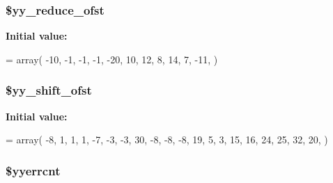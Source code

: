 \subsubsection[{\$yy\+\_\+reduce\+\_\+ofst}]{\setlength{\rightskip}{0pt plus 5cm}\$yy\+\_\+reduce\+\_\+ofst\hspace{0.3cm}{\ttfamily [static]}}\label{class_smarty___internal___configfileparser_a3b856b0c76686b62efda7789aae55234}
{\bfseries Initial value\+:}
\begin{DoxyCode}
= array(
    -10,   -1,   -1,   -1,  -20,   10,   12,    8,   14,    7,
    -11,
)
\end{DoxyCode}
\hypertarget{class_smarty___internal___configfileparser_a2209e68ce0fccc5f4739e063ee42ef0e}{}
\subsubsection[{\$yy\+\_\+shift\+\_\+ofst}]{\setlength{\rightskip}{0pt plus 5cm}\$yy\+\_\+shift\+\_\+ofst\hspace{0.3cm}{\ttfamily [static]}}\label{class_smarty___internal___configfileparser_a2209e68ce0fccc5f4739e063ee42ef0e}
{\bfseries Initial value\+:}
\begin{DoxyCode}
= array(
     -8,    1,    1,    1,   -7,   -3,   -3,   30,   -8,   -8,
     -8,   19,    5,    3,   15,   16,   24,   25,   32,   20,
)
\end{DoxyCode}
\hypertarget{class_smarty___internal___configfileparser_a439c58ecabc9563ba54aca3735b2fb9d}{}
\subsubsection[{\$yyerrcnt}]{\setlength{\rightskip}{0pt plus 5cm}\$yyerrcnt}\label{class_smarty___internal___configfileparser_a439c58ecabc9563ba54aca3735b2fb9d}
\hypertarget{class_smarty___internal___configfileparser_a1fe6200bd9f9078edd70b829fd19d5ee}{}

